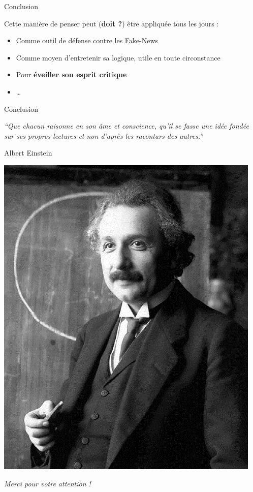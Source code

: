 \documentclass[usenames, dvipsnames, no-framenumber]{beamer}
\begin{document}
\begin{frame}%
{Conclusion}

Cette manière de penser peut (\textbf{doit ?}) être appliquée tous les jours \pause : 
\begin{itemize}
\item Comme outil de défense contre les Fake-News
\item Comme moyen d'entretenir sa logique, utile en toute circonstance
\item Pour \textbf{\alert{éveiller son esprit critique}}
\item \ldots
\end{itemize}

\end{frame}



\begin{frame}%
{Conclusion}
\begin{center}
\itshape
``Que chacun raisonne en son âme et conscience, qu'il se fasse une idée fondée sur ses propres lectures et non d'après les racontars des autres.''
\end{center}

\begin{flushright}
Albert Einstein
\end{flushright}

\begin{center}
\includegraphics[scale=0.2]{images/Einstein.jpg}
\end{center}
\end{frame}


\begin{frame}%
\vspace{1.5cm}
{\huge\color{umons-red}
\begin{center}
\textit{\textrm{Merci pour votre attention !}}
\end{center}}
\end{frame}
\end{document}
